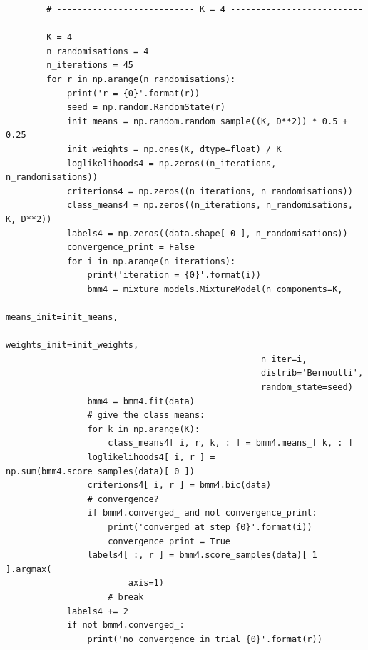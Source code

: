 \begin{verbatim}
        # --------------------------- K = 4 ------------------------------
        K = 4
        n_randomisations = 4
        n_iterations = 45
        for r in np.arange(n_randomisations):
            print('r = {0}'.format(r))
            seed = np.random.RandomState(r)
            init_means = np.random.random_sample((K, D**2)) * 0.5 + 0.25
            init_weights = np.ones(K, dtype=float) / K
            loglikelihoods4 = np.zeros((n_iterations, n_randomisations))
            criterions4 = np.zeros((n_iterations, n_randomisations))
            class_means4 = np.zeros((n_iterations, n_randomisations, K, D**2))
            labels4 = np.zeros((data.shape[ 0 ], n_randomisations))
            convergence_print = False
            for i in np.arange(n_iterations):
                print('iteration = {0}'.format(i))
                bmm4 = mixture_models.MixtureModel(n_components=K,
                                                  means_init=init_means,
                                                  weights_init=init_weights,
                                                  n_iter=i,
                                                  distrib='Bernoulli',
                                                  random_state=seed)
                bmm4 = bmm4.fit(data)
                # give the class means:
                for k in np.arange(K):
                    class_means4[ i, r, k, : ] = bmm4.means_[ k, : ]
                loglikelihoods4[ i, r ] = np.sum(bmm4.score_samples(data)[ 0 ])
                criterions4[ i, r ] = bmm4.bic(data)
                # convergence?
                if bmm4.converged_ and not convergence_print:
                    print('converged at step {0}'.format(i))
                    convergence_print = True
                labels4[ :, r ] = bmm4.score_samples(data)[ 1 ].argmax(
                        axis=1)
                    # break
            labels4 += 2
            if not bmm4.converged_:
                print('no convergence in trial {0}'.format(r))


\end{verbatim}
